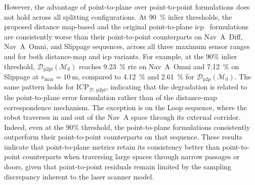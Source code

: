 \clearpage

However, the advantage of point-to-plane over point-to-point formulations does
not hold across all splitting configurations.
At \SI{90}{\percent} inlier thresholds, the proposed distance map-based and the
original point-to-plane \gls{icp}~\cite{chen-medioni:icra:1991} formulations are
consistently worse than their point-to-point counterparts on Nav~A~Diff,
Nav~A~Omni, and Slippage sequences, across all three maximum sensor ranges and
for both distance-map and \gls{icp} variants.
For example, at the 90\% inlier threshold,
$\mathcal{D}_\mathrm{p2pl}(\mathcal{M}_0)$ reaches \SI{9.23}{\percent} \gls{rte}
on Nav~A~Omni and \SI{7.12}{\percent} on Slippage at
$r_\mathrm{max} = \SI{10}{\metre}$, compared to \SI{4.12}{\percent} and
\SI{2.61}{\percent} for $\mathcal{D}_\mathrm{p2p}(\mathcal{M}_0)$.
The same pattern holds for $\mathrm{ICP}_{\mathcal{D},\,\mathrm{p2pl}}$,
indicating that the degradation is related to the point-to-plane error
formulation rather than of the distance-map correspondence mechanism.
The exception is on the Loop sequence, where the robot traverses in and out of
the Nav~A space through its external corridor. Indeed, even at the 90\%
threshold, the point-to-plane formulations consistently outperform their
point-to-point counterparts on that sequence. These results indicate that
point-to-plane metrics retain its consistency better than point-to-point
counterparts when traversing large spaces through narrow passages or doors,
given that point-to-point residuals remain limited by the sampling discrepancy
inherent to the laser scanner model.

